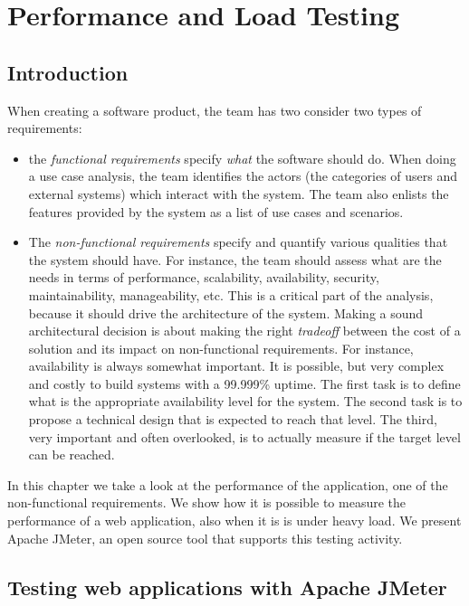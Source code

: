 \chapter{Performance and Load Testing}
\label{ch:performance-load-testing}

\section{Introduction}

When creating a software product, the team has two consider two types of requirements:

\begin{itemize}
\item the \emph{functional requirements} specify \emph{what} the software should do. When doing a use case analysis, the team identifies the actors (the categories of users and external systems) which interact with the system. The team also enlists the features provided by the system as a list of use cases and scenarios.
\item The \emph{non-functional requirements} specify and quantify various qualities that the system should have. For instance, the team should assess what are the needs in terms of performance, scalability, availability, security, maintainability, manageability, etc. This is a critical part of the analysis, because it should drive the architecture of the system. Making a sound architectural decision is about making the right \emph{tradeoff} between the cost of a solution and its impact on non-functional requirements. For instance, availability is always somewhat important. It is possible, but very complex and costly to build systems with a 99.999\% uptime. The first task is to define what is the appropriate availability level for the system. The second task is to propose a technical design that is expected to reach that level. The third, very important and often overlooked, is to actually measure if the target level can be reached.
\end{itemize}

In this chapter we take a look at the performance of the application, one of the non-functional requirements. We show how it is possible to measure the performance of a web application, also when it is is under heavy load. We present Apache JMeter, an open source tool that supports this testing activity.

\section{Testing web applications with Apache JMeter}

